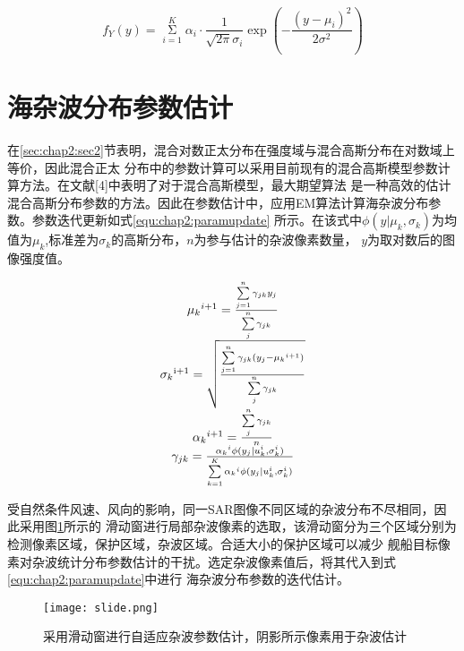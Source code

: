     \begin{equation}
      \label{equ:chap2:GMM}
        {f_Y}(y) = \mathop \Sigma \limits_{i = 1}^K {\alpha _i} \cdot \frac{1}{{\sqrt {2\pi } {\sigma _i}}}\exp ( - \frac{{{{(y - {\mu _i})}^2}}}{{2{\sigma ^2}}})
    \end{equation}


  \section{海杂波分布参数估计}

      在\ref{sec:chap2:sec2}节表明，混合对数正太分布在强度域与混合高斯分布在对数域上等价，因此混合正太
      分布中的参数计算可以采用目前现有的混合高斯模型参数计算方法。在文献[4]中表明了对于混合高斯模型，最大期望算法
      是一种高效的估计混合高斯分布参数的方法。因此在参数估计中，应用EM算法计算海杂波分布参数。参数迭代更新如式\ref{equ:chap2:paramupdate}
      所示。在该式中$\phi (y|{\mu _k},{\sigma _k})$为均值为$\mu_k$,标准差为$\sigma_k$的高斯分布，$n$为参与估计的杂波像素数量，
      $y$为取对数后的图像强度值。      

    \begin{equation}
      \label{equ:chap2:paramupdate}
      \begin{array}{*{20}{c}}
        {{\mu _k}^{i + 1} = \frac{{\sum\limits_{j = 1}^n {{\gamma _{jk}}{y_j}} }}{{\sum\limits_j^n {{\gamma _{jk}}} }}}\\
        {{\sigma _k}^{{\rm{i}} + 1} = \sqrt {\frac{{\sum\limits_{j = 1}^n {{\gamma _{jk}}({y_j} - {\mu _k}^{i + 1})} }}{{\sum\limits_j^n {{\gamma _{jk}}} }}} }\\
        {{\alpha _k}^{i + 1} = \frac{{\sum\limits_j^n {{\gamma _{jk}}} }}{n}}\\
        {{\gamma _{jk}} = \frac{{{\alpha _k}^i\phi ({y_j}|u_k^i,\sigma _k^i)}}{{\sum\limits_{k = 1}^K {{\alpha _k}^i\phi ({y_j}|u_k^i,\sigma _k^i)} }}}
      \end{array}
    \end{equation}

    受自然条件风速、风向的影响，同一SAR图像不同区域的杂波分布不尽相同，因此采用图\ref{fig:chap2:slide}所示的
    滑动窗进行局部杂波像素的选取，该滑动窗分为三个区域分别为检测像素区域，保护区域，杂波区域。合适大小的保护区域可以减少
    舰船目标像素对杂波统计分布参数估计的干扰。选定杂波像素值后，将其代入到式\ref{equ:chap2:paramupdate}中进行
    海杂波分布参数的迭代估计。

    \begin{figure}[H] %
      \centering
      \texttt{[image: slide.png]}
      \caption{采用滑动窗进行自适应杂波参数估计，阴影所示像素用于杂波估计}
      \label{fig:chap2:slide}
    \end{figure}   
